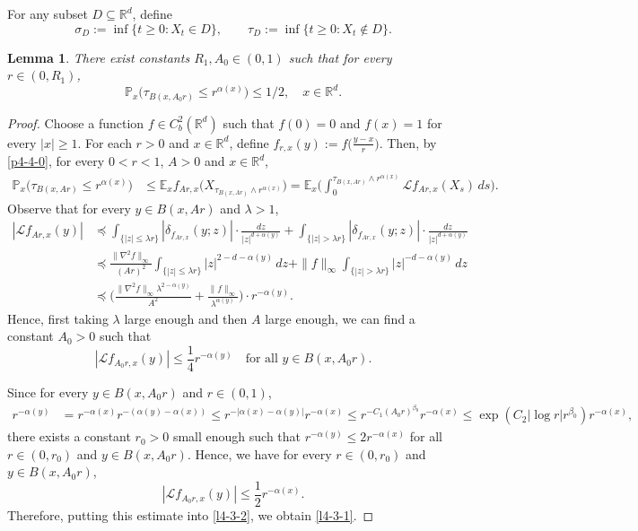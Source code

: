 \documentclass[a4paper,11pt]{amsart}
\renewcommand{\le}{\leqslant}
\renewcommand{\ge}{\geqslant}
\newcommand{\R}{\mathds R}
\newcommand{\B}{\beta}
\newcommand{\Pp}{\mathds P}
\newcommand{\Ee}{\mathds E}
\newcommand{\p}{\preceq}
\newcommand{\A}{\alpha}
\def\LL{{\mathcal L}}
\newtheorem{lemma}[theorem]{Lemma}
\theoremstyle{definition}
\begin{document}
For any subset $D\subseteq \R^d$, define
\begin{equation*}
\sigma_{D}:=\inf\{t \ge 0: X_t \in D\},\qquad \tau_D:=\inf\{t \ge 0: X_t \notin D\}.
\end{equation*}
\begin{lemma}\label{l4-3}
There exist constants $R_1,A_0\in (0,1)$ such that for every
$r \in (0,R_1)$,
\begin{equation}\label{l4-3-1}
\Pp_x\big(\tau_{B(x,A_0 r)}\le r^{\A(x)}\big)\le {1}/{2},\quad x\in \R^d.
\end{equation}
\end{lemma}
\begin{proof}
Choose a function $f \in C_b^2(\R^d)$ such that
$f(0)=0$ and $f(x)=1$ for every $|x|\ge 1$. For each $r>0$ and $x \in \R^d$, define
$f_{r,x}(y):=f\big(\frac{y-x}{r}\big)$.
Then, by \eqref{p4-4-0}, for every $0<r<1$, $A>0$ and $x \in \R^d$,
\begin{equation}\label{l4-3-2}
\begin{split}
\Pp_x \big(\tau_{B(x,Ar)}\le r^{\A(x)}\big)&\le \Ee_x f_{Ar,x}\big(X_{\tau_{B(x,Ar)}\wedge r^{\A(x)}}\big)=\Ee_x \Big(\int_0^{\tau_{B(x,Ar)}\wedge r^{\A(x)}}\LL f_{Ar,x}(X_s)\,ds\Big).
\end{split}
\end{equation}
Observe that for every $y \in B(x,Ar)$ and $\lambda>1$,
\begin{align*}
|\LL f_{Ar,x}(y)|&\p
\int_{\{|z|\le \lambda r\}}|\delta_{f_{Ar,x}}(y;z)|\cdot \frac{dz}{|z|^{d+\A(y)}}
+\int_{\{|z|>\lambda r\}}|\delta_{f_{Ar,x}}(y;z)|\cdot \frac{dz}{|z|^{d+\A(y)}}\\
&\p \frac{\|\nabla^2 f\|_{\infty}}{(Ar)^2}
\int_{\{|z|\le \lambda r\}}|z|^{2-d-\A(y)}\,dz+\|f\|_{\infty}
\int_{\{|z|> \lambda r\}}|z|^{-d-\A(y)}\,dz\\
&\p \bigg(\frac{\|\nabla^2 f\|_{\infty}\lambda^{2-\A(y)}}{A^2}+
\frac{\|f\|_{\infty}}{\lambda^{\A(y)}}\bigg)\cdot r^{-\A(y)}.
\end{align*}
Hence, first taking $\lambda$ large enough and then $A$ large enough, we can find a constant $A_0>0$ such that
\begin{equation*}
|\LL f_{A_0r,x}(y)|\le \frac{1}{4}r^{-\A(y)}\quad \textrm{for all } y \in B(x,A_0r).
\end{equation*}

Since for every $y \in B(x,A_0r)$ and $r\in (0,1)$,
\begin{align*}
r^{-\A(y)}&=r^{-\A(x)}r^{-(\A(y)-\A(x))}\le r^{-|\A(x)-\A(y)|}r^{-\A(x)}\le r^{-C_1(A_0r)^{\B_0}}r^{-\A(x)}\le \exp(C_2|\log r|r^{\B_0})r^{-\A(x)},
\end{align*}
there exists a constant $r_0>0$ small enough such that $r^{-\A(y)}\le 2 r^{-\A(x)}$ for all
$r \in (0,r_0)$ and $y \in B(x,A_0r)$. Hence, we have for every $r \in (0,r_0)$ and $y\in B(x,A_0r)$,
\begin{equation*}
|\LL f_{A_0r,x}(y)|\le \frac{1}{2}r^{-\A(x)}.
\end{equation*}
Therefore, putting this estimate into \eqref{l4-3-2}, we obtain \eqref{l4-3-1}.
\end{proof}
\end{document}
